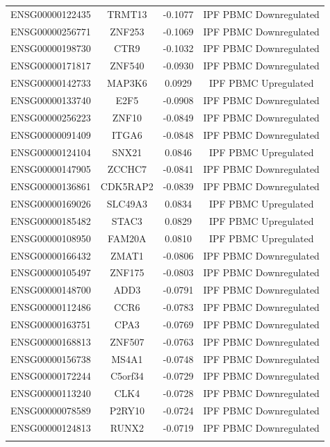 \documentclass[
]{article}
\begin{document}
\begin{singlespace}
\begin{longtable}[t]{lccc}
\addlinespace
ENSG00000122435 & TRMT13 & -0.1077 & IPF PBMC Downregulated\\
ENSG00000256771 & ZNF253 & -0.1069 & IPF PBMC Downregulated\\
ENSG00000198730 & CTR9 & -0.1032 & IPF PBMC Downregulated\\
ENSG00000171817 & ZNF540 & -0.0930 & IPF PBMC Downregulated\\
ENSG00000142733 & MAP3K6 & 0.0929 & IPF PBMC Upregulated\\
\addlinespace
ENSG00000133740 & E2F5 & -0.0908 & IPF PBMC Downregulated\\
ENSG00000256223 & ZNF10 & -0.0849 & IPF PBMC Downregulated\\
ENSG00000091409 & ITGA6 & -0.0848 & IPF PBMC Downregulated\\
ENSG00000124104 & SNX21 & 0.0846 & IPF PBMC Upregulated\\
ENSG00000147905 & ZCCHC7 & -0.0841 & IPF PBMC Downregulated\\
\addlinespace
ENSG00000136861 & CDK5RAP2 & -0.0839 & IPF PBMC Downregulated\\
ENSG00000169026 & SLC49A3 & 0.0834 & IPF PBMC Upregulated\\
ENSG00000185482 & STAC3 & 0.0829 & IPF PBMC Upregulated\\
ENSG00000108950 & FAM20A & 0.0810 & IPF PBMC Upregulated\\
ENSG00000166432 & ZMAT1 & -0.0806 & IPF PBMC Downregulated\\
\addlinespace
ENSG00000105497 & ZNF175 & -0.0803 & IPF PBMC Downregulated\\
ENSG00000148700 & ADD3 & -0.0791 & IPF PBMC Downregulated\\
ENSG00000112486 & CCR6 & -0.0783 & IPF PBMC Downregulated\\
ENSG00000163751 & CPA3 & -0.0769 & IPF PBMC Downregulated\\
ENSG00000168813 & ZNF507 & -0.0763 & IPF PBMC Downregulated\\
\addlinespace
ENSG00000156738 & MS4A1 & -0.0748 & IPF PBMC Downregulated\\
ENSG00000172244 & C5orf34 & -0.0729 & IPF PBMC Downregulated\\
ENSG00000113240 & CLK4 & -0.0728 & IPF PBMC Downregulated\\
ENSG00000078589 & P2RY10 & -0.0724 & IPF PBMC Downregulated\\
ENSG00000124813 & RUNX2 & -0.0719 & IPF PBMC Downregulated\\
\addlinespace

\end{longtable}
\end{singlespace}
\end{document}

